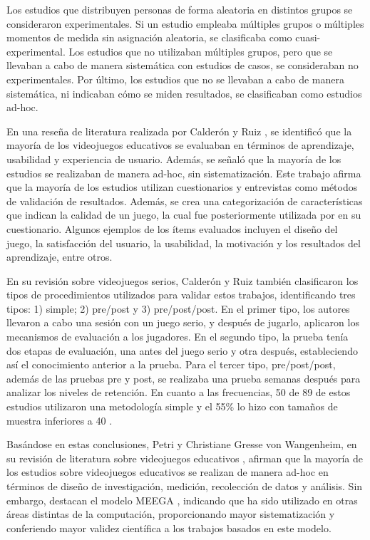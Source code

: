 Los estudios que distribuyen personas de forma aleatoria en distintos grupos se consideraron experimentales. Si un estudio empleaba múltiples grupos o múltiples momentos de medida sin asignación aleatoria, se clasificaba como cuasi-experimental. Los estudios que no utilizaban múltiples grupos, pero que se llevaban a cabo de manera sistemática con estudios de casos, se consideraban no experimentales. Por último, los estudios que no se llevaban a cabo de manera sistemática, ni indicaban cómo se miden resultados, se clasificaban como estudios ad-hoc.

En una reseña de literatura realizada por Calderón y Ruiz \cite{CalderonRuizReviewSeriousGamesEvaluation}, se identificó que la mayoría de los videojuegos educativos se evaluaban en términos de aprendizaje, usabilidad y experiencia de usuario. Además, se señaló que la mayoría de los estudios se realizaban de manera ad-hoc, sin sistematización. Este trabajo afirma que la mayoría de los estudios utilizan cuestionarios y entrevistas como métodos de validación de resultados. Además, se crea una categorización de características que indican la calidad de un juego, la cual fue posteriormente utilizada por \cite{meegaplus} en su cuestionario. Algunos ejemplos de los ítems evaluados incluyen el diseño del juego, la satisfacción del usuario, la usabilidad, la motivación y los resultados del aprendizaje, entre otros.

En su revisión sobre videojuegos serios, Calderón y Ruiz \cite{CalderonRuizReviewSeriousGamesEvaluation} también clasificaron los tipos de procedimientos utilizados para validar estos trabajos, identificando tres tipos: 1) simple; 2) pre/post y 3) pre/post/post. En el primer tipo, los autores llevaron a cabo una sesión con un juego serio, y después de jugarlo, aplicaron los mecanismos de evaluación a los jugadores. En el segundo tipo, la prueba tenía dos etapas de evaluación, una antes del juego serio y otra después, estableciendo así el conocimiento anterior a la prueba. Para el tercer tipo, pre/post/post, además de las pruebas pre y post, se realizaba una prueba semanas después para analizar los niveles de retención. En cuanto a las frecuencias, 50 de 89 de estos estudios utilizaron una metodología simple y el 55\% lo hizo con tamaños de muestra inferiores a 40 \cite{CalderonRuizReviewSeriousGamesEvaluation}.

Basándose en estas conclusiones, Petri y Christiane Gresse von Wangenheim, en su revisión de literatura sobre videojuegos educativos \cite{HowGamesComputingEducationEvaluated}, afirman que la mayoría de los estudios sobre videojuegos educativos se realizan de manera ad-hoc en términos de diseño de investigación, medición, recolección de datos y análisis. Sin embargo, destacan el modelo MEEGA \cite{meegaplusQualityEvaluationPage}, indicando que ha sido utilizado en otras áreas distintas de la computación, proporcionando mayor sistematización y conferiendo mayor validez científica a los trabajos basados en este modelo.


